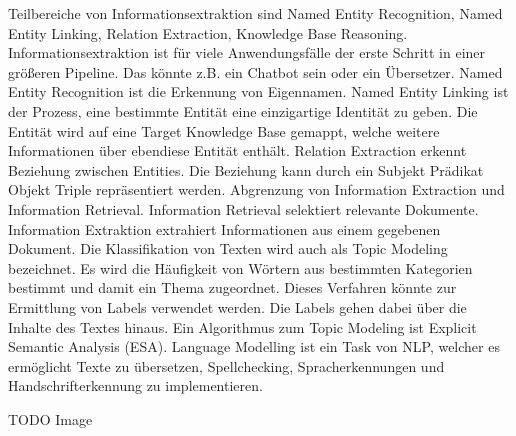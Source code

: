 Teilbereiche von Informationsextraktion sind Named Entity Recognition, Named Entity Linking, Relation Extraction, Knowledge Base Reasoning.
Informationsextraktion ist für viele Anwendungsfälle der erste Schritt in einer größeren Pipeline. Das könnte z.B. ein Chatbot sein oder ein Übersetzer.
Named Entity Recognition ist die Erkennung von Eigennamen. Named Entity Linking ist der Prozess, eine bestimmte Entität eine einzigartige Identität zu geben. Die Entität wird auf eine Target Knowledge Base gemappt, welche weitere Informationen über ebendiese Entität enthält.
Relation Extraction erkennt Beziehung zwischen Entities. Die Beziehung kann durch ein Subjekt Prädikat Objekt Triple repräsentiert werden.
Abgrenzung von Information Extraction und Information Retrieval. Information Retrieval selektiert relevante Dokumente. Information Extraktion extrahiert Informationen aus einem gegebenen Dokument.
Die Klassifikation von Texten wird auch als Topic Modeling bezeichnet. Es wird die Häufigkeit von Wörtern aus bestimmten Kategorien bestimmt und damit ein Thema zugeordnet. Dieses Verfahren könnte zur Ermittlung von Labels verwendet werden. Die Labels gehen dabei über die Inhalte des Textes hinaus. Ein Algorithmus zum Topic Modeling ist Explicit Semantic Analysis (ESA).
Language Modelling ist ein Task von NLP, welcher es ermöglicht Texte zu übersetzen, Spellchecking, Spracherkennungen und Handschrifterkennung zu implementieren.

TODO Image
